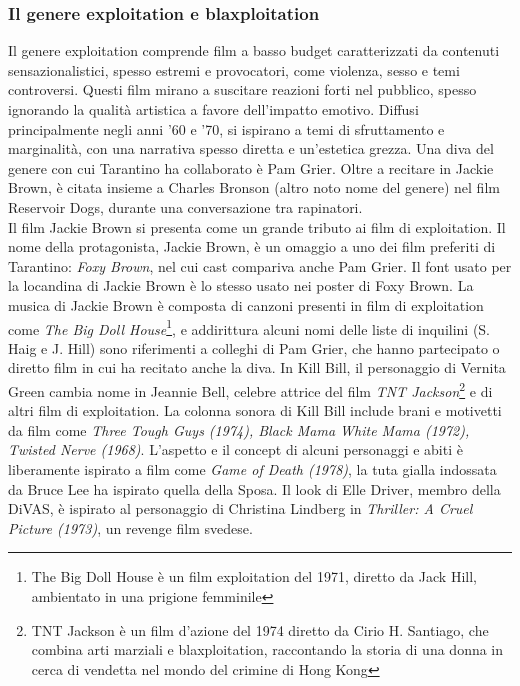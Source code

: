 \documentclass[12pt]{article} %
\begin{document}
\subsubsection*{Il genere exploitation e blaxploitation}
\begin{flushleft}
    Il genere exploitation comprende film a basso budget caratterizzati da contenuti sensazionalistici, spesso estremi e provocatori, come violenza, sesso e temi controversi. Questi film mirano a suscitare reazioni forti nel pubblico, spesso ignorando la qualità artistica a favore dell'impatto emotivo. Diffusi principalmente negli anni '60 e '70, si ispirano a temi di sfruttamento e marginalità, con una narrativa spesso diretta e un'estetica grezza.
    Una diva del genere con cui Tarantino ha collaborato è Pam Grier. Oltre a recitare in Jackie Brown, è citata insieme a Charles Bronson (altro noto nome del genere) nel film Reservoir Dogs, durante una conversazione tra rapinatori.\\\vspace{1cm}
    Il film Jackie Brown si presenta come un grande tributo ai film di exploitation. Il nome della protagonista, Jackie Brown, è un omaggio a uno dei film preferiti di Tarantino: \textit{Foxy Brown}, nel cui cast compariva anche Pam Grier. Il font usato per la locandina di Jackie Brown è lo stesso usato nei poster di Foxy Brown. La musica di Jackie Brown è composta di canzoni presenti in film di exploitation come \textit{The Big Doll House}\footnote{The Big Doll House è un film exploitation del 1971, diretto da Jack Hill, ambientato in una prigione femminile}, e addirittura alcuni nomi delle liste di inquilini (S. Haig e J. Hill) sono riferimenti a colleghi di Pam Grier, che hanno partecipato o diretto film in cui ha recitato anche la diva.
    In Kill Bill, il personaggio di Vernita Green cambia nome in Jeannie Bell, celebre attrice del film \textit{TNT Jackson}\footnote{TNT Jackson è un film d'azione del 1974 diretto da Cirio H. Santiago, che combina arti marziali e blaxploitation, raccontando la storia di una donna in cerca di vendetta nel mondo del crimine di Hong Kong} e di altri film di exploitation. La colonna sonora di Kill Bill include brani e motivetti da film come \textit{Three Tough Guys (1974), Black Mama White Mama (1972), Twisted Nerve (1968)}. L'aspetto e il concept di alcuni personaggi e abiti è liberamente ispirato a film come \textit{Game of Death (1978)}, la tuta gialla indossata da Bruce Lee ha ispirato quella della Sposa. Il look di Elle Driver, membro della DiVAS, è ispirato al personaggio di Christina Lindberg in \textit{Thriller: A Cruel Picture (1973)}, un revenge film svedese.

\end{flushleft}
\end{document}
